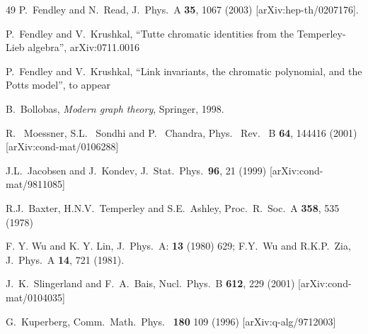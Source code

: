 \documentclass[11pt]{article}
\begin{document}
\begin{thebibliography}{49}
P.~Fendley and N.~Read,
J.~Phys.\ A {\bf 35}, 1067 (2003) 
[arXiv:hep-th/0207176].


P.~Fendley and V.~Krushkal, 
``Tutte chromatic identities from the Temperley-Lieb algebra'',
arXiv:0711.0016 

P.~Fendley and V.~Krushkal, ``Link invariants, the chromatic
polynomial, and the Potts model'', to appear

 B.~Bollobas, {\em Modern graph theory}, Springer, 1998.

R.~ Moessner, S.L.~ Sondhi and P.~ Chandra,
Phys.~ Rev.~ B {\bf 64}, 144416 (2001) 
[arXiv:cond-mat/0106288]



J.L.~Jacobsen and J.~Kondev, J.~Stat.~Phys.\ {\bf 96}, 21 (1999) 
[arXiv:cond-mat/9811085]

R.J.~Baxter, H.N.V.~Temperley and S.E.~Ashley, Proc.~R.~Soc.\ A {\bf 358}, 535
(1978)

F. Y. Wu and K. Y. Lin, J.~Phys.~A: {\bf 13} (1980) 629;
F.Y.~Wu and R.K.P.~Zia, 
J.~Phys.~A {\bf 14}, 721 (1981).

  J.~K.~Slingerland and F.~A.~Bais,
  Nucl.\ Phys.\  B {\bf 612}, 229 (2001)
  [arXiv:cond-mat/0104035]

G.~Kuperberg, Comm.~Math.~Phys.~ {\bf 180} 109 (1996)
 [arXiv:q-alg/9712003]

\end{thebibliography}
\end{document}

